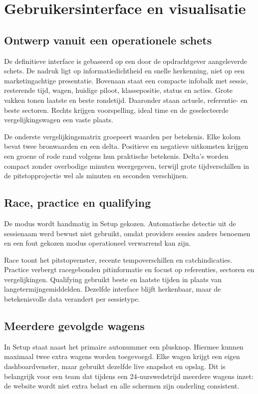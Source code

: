 \chapter{Gebruikersinterface en visualisatie}
\label{chap:interface}

\section{Ontwerp vanuit een operationele schets}
De definitieve interface is gebaseerd op een door de opdrachtgever aangeleverde schets. De nadruk ligt op informatiedichtheid en snelle herkenning, niet op een marketingachtige presentatie. Bovenaan staat een compacte infobalk met sessie, resterende tijd, wagen, huidige piloot, klassepositie, status en acties. Grote vakken tonen laatste en beste rondetijd. Daaronder staan actuele, referentie- en beste sectoren. Rechts krijgen voorspelling, ideal time en de geselecteerde vergelijkingswagen een vaste plaats.

De onderste vergelijkingsmatrix groepeert waarden per betekenis. Elke kolom bevat twee bronwaarden en een delta. Positieve en negatieve uitkomsten krijgen een groene of rode rand volgens hun praktische betekenis. Delta's worden compact zonder overbodige minuten weergegeven, terwijl grote tijdverschillen in de pitstopprojectie wel als minuten en seconden verschijnen.

\section{Race, practice en qualifying}
De modus wordt handmatig in Setup gekozen. Automatische detectie uit de sessienaam werd bewust niet gebruikt, omdat providers sessies anders benoemen en een fout gekozen modus operationeel verwarrend kan zijn.

Race toont het pitstopvenster, recente tempoverschillen en catchindicaties. Practice verbergt racegebonden pitinformatie en focust op referenties, sectoren en vergelijkingen. Qualifying gebruikt beste en laatste tijden in plaats van langetermijngemiddelden. Dezelfde interface blijft herkenbaar, maar de betekenisvolle data verandert per sessietype.

\section{Meerdere gevolgde wagens}
In Setup staat naast het primaire autonummer een plusknop. Hiermee kunnen maximaal twee extra wagens worden toegevoegd. Elke wagen krijgt een eigen dashboardvenster, maar gebruikt dezelfde live snapshot en opslag. Dit is belangrijk voor een team dat tijdens een 24-uurswedstrijd meerdere wagens inzet: de website wordt niet extra belast en alle schermen zijn onderling consistent.

